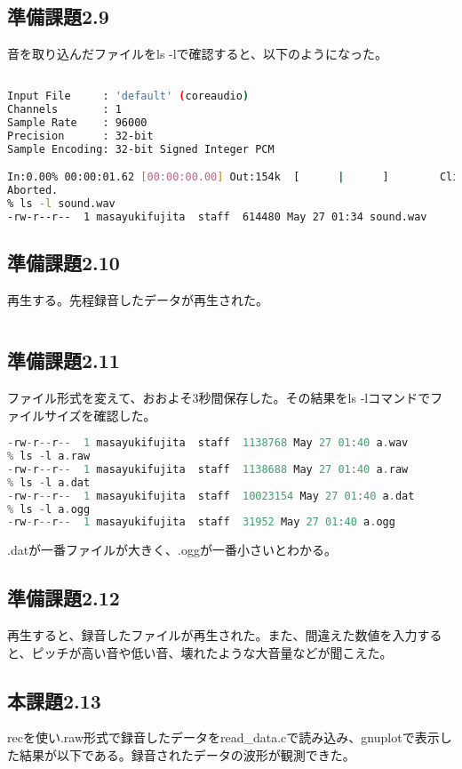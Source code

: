 \documentclass{ltjsarticle}
\begin{document}
\subsection{準備課題2.9}
音を取り込んだファイルをls -lで確認すると、以下のようになった。
\begin{lstlisting}[caption=recコマンド,language=bash]
% rec sound.wav

Input File     : 'default' (coreaudio)
Channels       : 1
Sample Rate    : 96000
Precision      : 32-bit
Sample Encoding: 32-bit Signed Integer PCM

In:0.00% 00:00:01.62 [00:00:00.00] Out:154k  [      |      ]        Clip:0    ^C
Aborted.
% ls -l sound.wav
-rw-r--r--  1 masayukifujita  staff  614480 May 27 01:34 sound.wav
\end{lstlisting}

\subsection{準備課題2.10}
再生する。先程録音したデータが再生された。
\begin{lstlisting}[caption=playコマンド,language=bash]
% play sound.wav
\end{lstlisting}

\subsection{準備課題2.11}
ファイル形式を変えて、おおよそ3秒間保存した。その結果をls -lコマンドでファイルサイズを確認した。
\begin{lstlisting}[caption=ファイル形式,language=C]
% ls -l a.wav
-rw-r--r--  1 masayukifujita  staff  1138768 May 27 01:40 a.wav
% ls -l a.raw
-rw-r--r--  1 masayukifujita  staff  1138688 May 27 01:40 a.raw
% ls -l a.dat
-rw-r--r--  1 masayukifujita  staff  10023154 May 27 01:40 a.dat
% ls -l a.ogg
-rw-r--r--  1 masayukifujita  staff  31952 May 27 01:40 a.ogg
\end{lstlisting}
.datが一番ファイルが大きく、.oggが一番小さいとわかる。

\subsection{準備課題2.12}
再生すると、録音したファイルが再生された。また、間違えた数値を入力すると、ピッチが高い音や低い音、壊れたような大音量などが聞こえた。

\subsection{本課題2.13}
recを使い.raw形式で録音したデータをread\_data.cで読み込み、gnuplotで表示した結果が以下である。録音されたデータの波形が観測できた。
\end{document}
